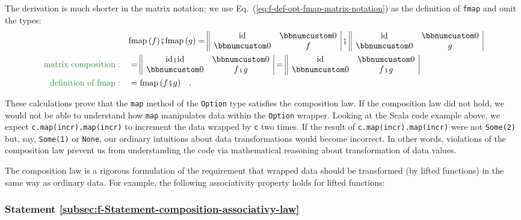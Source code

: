 The derivation is much shorter in the matrix notation; we use Eq.~(\ref{eq:f-def-opt-fmap-matrix-notation})
as the definition of \lstinline!fmap! and omit the types:\vspace{-0.45\baselineskip}
\begin{align*}
 & \text{fmap}\,(f)\bef\text{fmap}\,(g)=\begin{array}{||cc|}
\text{id} & \bbnum 0\\
\bbnum 0 & f
\end{array}\,\bef\,\begin{array}{||cc|}
\text{id} & \bbnum 0\\
\bbnum 0 & g
\end{array}\\
{\color{greenunder}\text{matrix composition}:}\quad & =\begin{array}{||cc|}
\text{id}\bef\text{id} & \bbnum 0\\
\bbnum 0 & f\bef g
\end{array}=\begin{array}{||cc|}
\text{id} & \bbnum 0\\
\bbnum 0 & f\bef g
\end{array}\\
{\color{greenunder}\text{definition of fmap}:}\quad & =\text{fmap}\,(f\bef g)\quad.
\end{align*}
\vspace{-1.4\baselineskip}

These calculations prove that the \lstinline!map! method of the \lstinline!Option!
type satisfies the composition law. If the composition law did not
hold, we would not be able to understand how \lstinline!map! manipulates
data within the \lstinline!Option! wrapper. Looking at the Scala
code example above, we expect \lstinline!c.map(incr).map(incr)! to
increment the data wrapped by \lstinline!c! two times. If the result
of \lstinline!c.map(incr).map(incr)! were not \lstinline!Some(2)!
but, say, \lstinline!Some(1)! or \lstinline!None!, our ordinary
intuitions about data transformations would become incorrect. In other
words, violations of the composition law prevent us from understanding
the code via mathematical reasoning about transformation of data values.

The composition law is a rigorous formulation of the requirement that
wrapped data should be transformed (by lifted functions) in the same
way as ordinary data. For example, the following associativity property
holds for lifted functions:

\subsubsection{Statement \label{subsec:f-Statement-composition-associativy-law}\ref{subsec:f-Statement-composition-associativy-law}}

